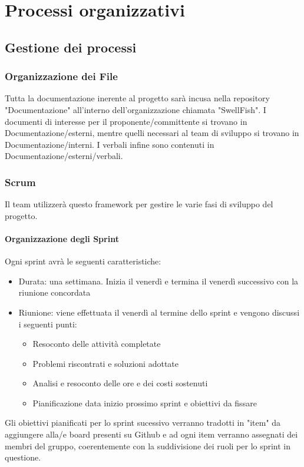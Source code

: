 \documentclass[12pt]{article}
\begin{document}
\section{Processi organizzativi}
\subsection{Gestione dei processi}
\subsubsection{Organizzazione dei File}
Tutta la documentazione inerente al progetto sarà incusa nella repository "Documentazione" all'interno dell'organizzazione chiamata "SwellFish".
I documenti di interesse per il proponente/committente si trovano in Documentazione/esterni, mentre quelli necessari al team di sviluppo si trovano in Documentazione/interni. 
I verbali infine sono contenuti in Documentazione/esterni/verbali.

\subsubsection{Scrum}
Il team utilizzerà questo framework per gestire le varie fasi di sviluppo del progetto.
\paragraph{Organizzazione degli Sprint}
Ogni sprint avrà le seguenti caratteristiche:
\begin{itemize}
    \item Durata: una settimana. Inizia il venerdì e termina il venerdì successivo con la riunione concordata
    \item Riunione: viene effettuata il venerdì al termine dello sprint e vengono discussi i seguenti punti:
    \begin{itemize}
        \item Resoconto delle attività completate
        \item Problemi riscontrati e soluzioni adottate
        \item Analisi e resoconto delle ore e dei costi sostenuti
        \item Pianificazione data inizio prossimo sprint e obiettivi da fissare
    \end{itemize}
\end{itemize}
Gli obiettivi pianificati per lo sprint sucessivo verranno tradotti in "item" da aggiungere alla/e board presenti su Github e ad ogni item verranno assegnati dei membri del gruppo, coerentemente con la suddivisione dei ruoli per lo sprint in questione.
    
\end{document}
